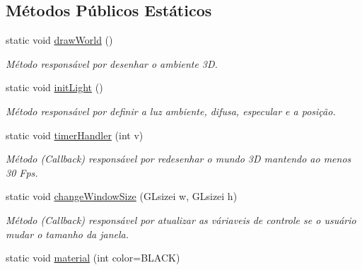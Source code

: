 \subsection*{Métodos Públicos Estáticos}
\begin{DoxyCompactItemize}
\item 
static void \hyperlink{classGraphics_ab65394158d2a2fa6a613fcb074ac808e}{draw\+World} ()
\begin{DoxyCompactList}\small\item\em Método responsável por desenhar o ambiente 3D. \end{DoxyCompactList}\item 
static void \hyperlink{classGraphics_a3549ba0484b18d43c6602fb0b57a29a6}{init\+Light} ()\hypertarget{classGraphics_a3549ba0484b18d43c6602fb0b57a29a6}{}\label{classGraphics_a3549ba0484b18d43c6602fb0b57a29a6}

\begin{DoxyCompactList}\small\item\em Método responsável por definir a luz ambiente, difusa, especular e a posição. \end{DoxyCompactList}\item 
static void \hyperlink{classGraphics_aa2795786eef8c99a7232a195992a9c82}{timer\+Handler} (int v)
\begin{DoxyCompactList}\small\item\em Método (Callback) responsável por redesenhar o mundo 3D mantendo ao menos 30 Fps. \end{DoxyCompactList}\item 
static void \hyperlink{classGraphics_a78ef6a0b1f6c142c9d650ffddfbaa2ed}{change\+Window\+Size} (G\+Lsizei w, G\+Lsizei h)\hypertarget{classGraphics_a78ef6a0b1f6c142c9d650ffddfbaa2ed}{}\label{classGraphics_a78ef6a0b1f6c142c9d650ffddfbaa2ed}

\begin{DoxyCompactList}\small\item\em Método (Callback) responsável por atualizar as váriaveis de controle se o usuário mudar o tamanho da janela. \end{DoxyCompactList}\item 
static void \hyperlink{classGraphics_ab3134b5ca29b658f4ac5cc12fa4b4705}{material} (int color=B\+L\+A\+CK)\hypertarget{classGraphics_ab3134b5ca29b658f4ac5cc12fa4b4705}{}\label{classGraphics_ab3134b5ca29b658f4ac5cc12fa4b4705}


\end{DoxyCompactItemize}
